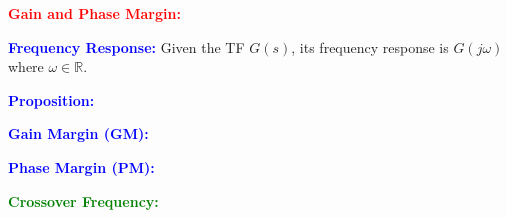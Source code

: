 \documentclass[5pt]{extarticle} %
\begin{document}
\begin{paracol}{3}
{    \textcolor{red}{\textbf{Gain and Phase Margin:}} 

    \textcolor{blue}{\textbf{Frequency Response:}} Given the TF $G(s)$, its frequency response is $G(j \omega)$ where $\omega \in \mathbb{R}$. 

    \textcolor{blue}{\textbf{Proposition:}} 

    \textcolor{blue}{\textbf{Gain Margin (GM):}} 

    \textcolor{blue}{\textbf{Phase Margin (PM):}}

    \textcolor{green}{\textbf{Crossover Frequency:}} 
    
        }
\end{paracol}
\end{document}
